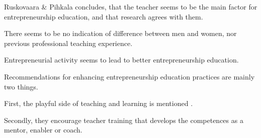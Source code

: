 Ruskovaara \& Pihkala \cite{ruskovaara} concludes, that the teacher seems to be the main factor for entrepreneurship education, and that research agrees with them.

There seems to be no indication of difference between men and women, nor previous professional teaching experience.

Entrepreneurial activity seems to lead to better entrepreneurship education.

Recommendations for enhancing entrepreneurship education practices are mainly two things.

First, the playful side of teaching and learning is mentioned \cite{solomon}.

Secondly, they encourage teacher training that develops the competences as a mentor, enabler or coach.
